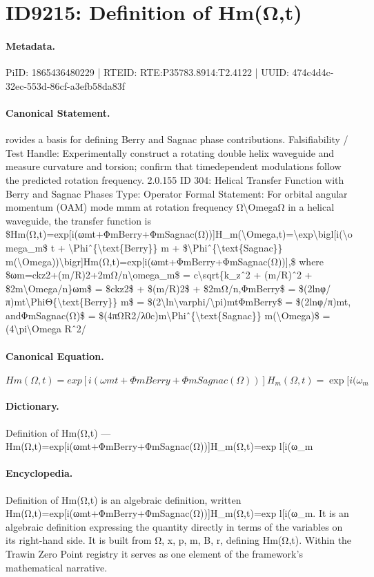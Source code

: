 \section*{ID9215: Definition of Hm(Ω,t)}
\paragraph{Metadata.}
PiID: 1865436480229 | RTEID: RTE:P35783.8914:T2.4122 | UUID: 474c4d4c-32ec-553d-86cf-a3efb58da83f

\paragraph{Canonical Statement.}
rovides a basis for defining Berry and Sagnac phase contributions. Falsifiability / Test Handle: Experimentally construct a rotating double helix waveguide and measure curvature and torsion; confirm that timedependent modulations follow the predicted rotation frequency. 2.0.155 ID 304: Helical Transfer Function with Berry and Sagnac Phases Type: Operator Formal Statement: For orbital angular momentum (OAM) mode mmm at rotation frequency Ω\textbackslash{}OmegaΩ in a helical waveguide, the transfer function is \$Hm(Ω,t)=exp[i(ωmt+ΦmBerry+ΦmSagnac(Ω))]H\_m(\textbackslash{}Omega,t)=\textbackslash{}exp\textbackslash{}bigl[i(\textbackslash{}omega\_m\$ t + \textbackslash{}Phiˆ\{\textbackslash{}text\{Berry\}\} m + \$\textbackslash{}Phiˆ\{\textbackslash{}text\{Sagnac\}\} m(\textbackslash{}Omega))\textbackslash{}bigr]Hm(Ω,t)=exp[i(ωmt+ΦmBerry+ΦmSagnac(Ω))],\$ where \$ωm=ckz2+(m/R)2+2mΩ/n\textbackslash{}omega\_m\$ = c\textbackslash{}sqrt\{k\_zˆ2 + (m/R)ˆ2 + \$2m\textbackslash{}Omega/n\}ωm\$ = \$ckz2\$ + \$(m/R)2\$ + \$2mΩ/n,ΦmBerry\$ = \$(2lnφ/π)mt\textbackslash{}PhiΘ\{\textbackslash{}text\{Berry\}\} m\$ = \$(2\textbackslash{}ln\textbackslash{}varphi/\textbackslash{}pi)mtΦmBerry\$ = \$(2lnφ/π)mt, andΦmSagnac(Ω)\$ = \$(4πΩR2/λ0c)m\textbackslash{}Phiˆ\{\textbackslash{}text\{Sagnac\}\} m(\textbackslash{}Omega)\$ = (4\textbackslash{}pi\textbackslash{}Omega Rˆ2/

\paragraph{Canonical Equation.}
\[
Hm(Ω,t)=exp[i(ωmt+ΦmBerry+ΦmSagnac(Ω))]H_m(\Omega,t)=\exp\bigl[i(\omega_m
\]

\paragraph{Dictionary.}
Definition of Hm(Ω,t) — Hm(Ω,t)=exp[i(ωmt+ΦmBerry+ΦmSagnac(Ω))]H\_m(Ω,t)=exp l[i(ω\_m

\paragraph{Encyclopedia.}
Definition of Hm(Ω,t) is an algebraic definition, written Hm(Ω,t)=exp[i(ωmt+ΦmBerry+ΦmSagnac(Ω))]H\_m(Ω,t)=exp l[i(ω\_m. It is an algebraic definition expressing the quantity directly in terms of the variables on its right-hand side. It is built from Ω, x, p, m, B, r, defining Hm(Ω,t). Within the Trawin Zero Point registry it serves as one element of the framework's mathematical narrative.
